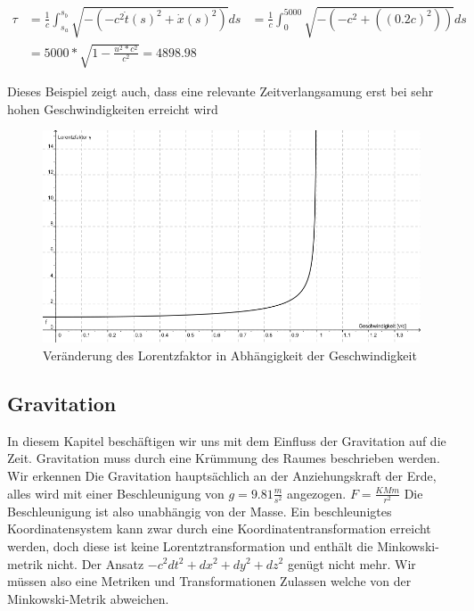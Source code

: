 \begin{refsection}
\begin{align*}
    \tau
    &=
    \frac{1}{c}\int_{s_{a}}^{s_{b}}\sqrt{-(-c^2\dot{t}(s)^2+\dot{x}(s)^2)}ds
    &=
    \frac{1}{c}\int_{0}^{5000}\sqrt{-(-c^2+((0.2c)^2))}ds\\
    &=
    5000*\sqrt{1-\frac{u^2*c^2}{c^2}} = 4898.98
\end{align*}

Dieses Beispiel zeigt auch, dass eine relevante Zeitverlangsamung erst bei sehr hohen Geschwindigkeiten erreicht wird

\begin{figure}
    \centering
    \includegraphics[width=\hsize]{zeitreisen/Lorentzfaktor.jpg}
    \caption{Ver\"anderung des Lorentzfaktor in Abh\"angigkeit der Geschwindigkeit%
        \label{skript:geodaten:fig:transport}}
\end{figure}

\subsection{Gravitation}

In diesem Kapitel beschäftigen wir uns mit dem Einfluss der Gravitation auf die Zeit. Gravitation muss durch eine Krümmung des Raumes beschrieben werden. Wir erkennen Die Gravitation hauptsächlich an der Anziehungskraft der Erde, alles wird mit einer Beschleunigung von $g=9.81\frac{m}{s^2}$ angezogen. $F=\frac{KMm}{r^2}$
Die Beschleunigung ist also unabhängig von der Masse.
Ein beschleunigtes Koordinatensystem kann zwar durch eine Koordinatentransformation erreicht werden, doch diese ist keine Lorentztransformation und enthält die Minkowski-metrik nicht. Der Ansatz $ -c^2dt^2 + dx^2 + dy^2 + dz^2$ genügt nicht mehr. Wir müssen also eine Metriken und Transformationen Zulassen welche von der Minkowski-Metrik abweichen. 




\printbibliography[heading=subbibliography]
\end{refsection}

